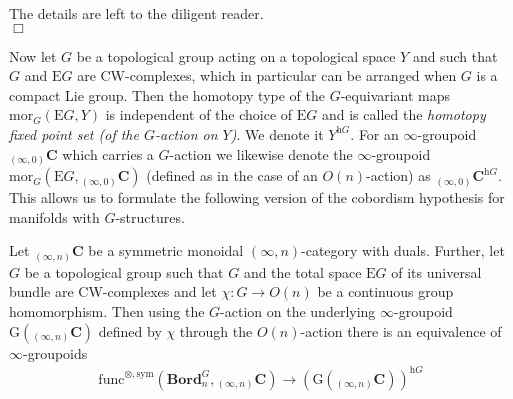 \begin{prf}
The details are left to the diligent reader.
\\
\phantom{proven}
\hfill
$\Box$
\end{prf}
Now let $G$ be a topological group acting on a topological space $Y$ and such that $G$ and $\mathrm{E}G$ are CW-complexes, which in particular can be arranged when $G$ is a compact Lie group. Then the homotopy type of the $G$-equivariant maps $\mathrm{mor}_{G}(\mathrm{E}G,Y)$ is independent of the choice of $\mathrm{E}G$ and is called the \textit{homotopy fixed point set (of the $G$-action on $Y$)}. We denote it $Y^{\mathrm{h}G}$. For an $\infty$-groupoid ${_{(\infty,0)}}\mathbf{C}$ which carries a $G$-action we likewise denote the $\infty$-groupoid $\mathrm{mor}_{G}(\mathrm{E}G,{_{(\infty,0)}}\mathbf{C})$ (defined as in the case of an $O(n)$-action) as ${_{(\infty,0)}}\mathbf{C}^{\mathrm{h}G}$. This allows us to formulate the following version of the cobordism hypothesis for manifolds with $G$-structures.
\\
\begin{cor}
\label{cor:cobhypgstruct}
Let ${_{(\infty,n)}}\mathbf{C}$ be a symmetric monoidal $(\infty,n)$-category with duals. Further, let $G$ be a topological group such that $G$ and the total space $\mathrm{E}G$ of its universal bundle are CW-complexes and let $\chi \colon G \to O(n)$ be a continuous group homomorphism. Then using the $G$-action on the underlying $\infty$-groupoid $\mathrm{G}({_{(\infty,n)}}\mathbf{C})$ defined by $\chi$ through the $O(n)$-action there is an equivalence of $\infty$-groupoids
\begin{align*}
  \mathrm{func}^{\otimes,\mathrm{sym}}
  \left(
    \mathbf{Bord}_{n}^{G}
    ,
    {_{(\infty,n)}}\mathbf{C}
  \right)
  \to
  \left(
    \mathrm{G}({_{(\infty,n)}}\mathbf{C})
  \right)^{\mathrm{h}G}
\end{align*}
\end{cor}
